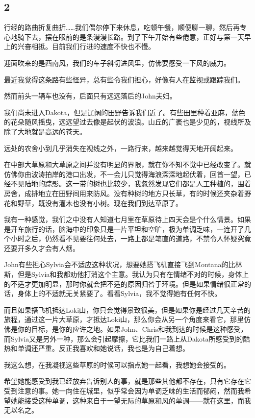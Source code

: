 \documentclass[UTF8]{article}
\begin{document}
\subsection*{2}
\par 行经的路曲折复曲折……我们偶尔停下来休息，吃顿午餐，顺便聊一聊，然后再专心地骑下去，摆在眼前的是条漫漫长路。到了下午开始有些倦意，正好与第一天早上的兴奋相抵。目前我们行进的速度不快也不慢。
\par 迎面吹来的是西南风，我们的车子斜切进风里，仿佛要感受一下风的威力。
\par 最近我觉得这条路有些怪异，总有些令我们担心，好像有人在监视或跟踪我们。
\par 然而前头一辆车也没有，后面只有远远落后的John夫妇。
\par 我们尚未进入Dakota，但是辽阔的田野告诉我们近了。有些田里种着亚麻，蓝色的花朵随风摇曳，远远望过去像是起伏的波浪。山丘的广袤也是少见的，视线所及除了大地就是高远的苍天。
\par 远处的农舍小到几乎消失在视线之外，一路行来，越来越觉得天地开阔起来。
\par 在中部大草原和大草原之间并没有明显的界限，就在你不知不觉中已经改变了。就仿佛你由波涛拍岸的港口出发，不一会儿只觉得海浪深深地起伏着，回首一望，已经不见陆地的踪影。这一带的树也比较少，我忽然发现它们都是人工种植的，围着房舍，成排地立在田野间用来防风。没有种树的地方只长草，有的时候还夹杂着野花和野草，既没有灌木也没有小树。现在我们到达草原了。
\par 我有一种感觉，我们之中没有人知道七月里在草原待上四天会是个什么情景。如果是开车旅行的话，脑海中的印象只是一片平坦和空旷，极为单调乏味，一连开了几个小时之后，仍然看不见要往何处去，一路上都是笔直的道路，不禁令人怀疑究竟还要开多久才会有人烟。
\par John有些担心Sylvia会不适应这种状况，想要她搭飞机直接飞到Montana的比林斯，但是Sylvia和我都劝他打消这个主意。我认为只有在情绪不对的时候，身体上的不适才更加明显，那时你就会把不适的原因归咎于环境。但是如果情绪很正常的话，身体上的不适就无关紧要了。看看Sylvia，我不觉得她有任何不快。
\par 而且如果搭飞机抵达Loki山，你只会觉得景致很美，但是如果你是经过几天辛苦的旅程，通过这一片大草原，才抵达Loki山，那么你会从另一个角度来看它，那里仿佛是你的目标，是你的应许之地。如果John、Chris和我到达的时候是这种感受，而Sylvia又是另外一种，那么会引起摩擦，它比我们一路上从Dakota所感受到的酷热和单调还严重。反正我喜欢和她说话，我也是为自己着想。
\par 我这么想，在我凝视这些草原的时候可以指点她一起看，我想她会接受的。
\par 希望她能感受到我已经放弃告诉别人的事，就是那些其他都不存在，只有它存在它受到注意的事。她一向住在城里，似乎常会因为单调乏味的生活而郁闷，然而我希望她能接受这种单调，这种来自于一望无际的草原和风的单调——就在这里，而我无以名之。
\end{document}
